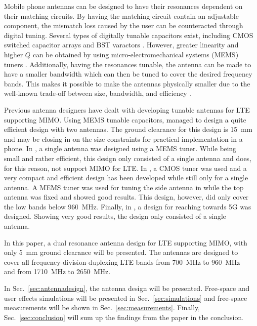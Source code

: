Mobile phone antennas can be designed to have their resonances dependent on their matching circuits. By having the matching circuit contain an adjustable component, the mismatch loss caused by the user can be counteracted through digital tuning. Several types of digitally tunable capacitors exist, including CMOS switched capacitor arrays and BST varactors \cite{gu2014rf}. However, greater linearity and higher $Q$ can be obtained by using micro-electromechanical systems (MEMS) tuners \cite{gu2014rf}. Additionally, having the resonances tunable, the antenna can be made to have a smaller bandwidth which can then be tuned to cover the desired frequency bands. This makes it possible to make the antennas physically smaller due to the well-known trade-off between size, bandwidth, and efficiency \cite{hilbert2015tradeoff}.

Previous antenna designers have dealt with developing tunable antennas for LTE supporting MIMO. Using MEMS tunable capacitors, \cite{ilvonen2014multiband} managed to design a quite efficient design with two antennas. The ground clearance for this design is \SI{15}{mm} and may be closing in on the size constraints for practical implementation in a phone. In \cite{morris2014tunable}, a single antenna was designed using a MEMS tuner. While being small and rather efficient, this design only consisted of a single antenna and does, for this reason, not support MIMO for LTE. In \cite{xia2015compact}, a CMOS tuner was used and a very compact and efficient design has been developed while still only for a single antenna. A MEMS tuner was used for tuning the side antenna in \cite{tatomirescu2015alternative} while the top antenna was fixed and showed good results. This design, however, did only cover the low bands below \SI{960}{MHz}. Finally, in \cite{trinh2016reconfigurable}, a design for reaching towards 5G was designed. Showing very good results, the design only consisted of a single antenna.

In this paper, a dual resonance antenna design for LTE supporting MIMO, with only \SI{5}{mm} ground clearance will be presented. The antennas are designed to cover all frequency-division-duplexing LTE bands from \SI{700}{MHz} to \SI{960}{MHz} and from \SI{1710}{MHz} to \SI{2650}{MHz}.

In Sec.~\ref{sec:antennadesign}, the antenna design will be presented. Free-space and user effects simulations will be presented in Sec.~\ref{sec:simulations} and free-space measurements will be shown in Sec.~\ref{sec:measurements}. Finally, Sec.~\ref{sec:conclusion} will sum up the findings from the paper in the conclusion.

